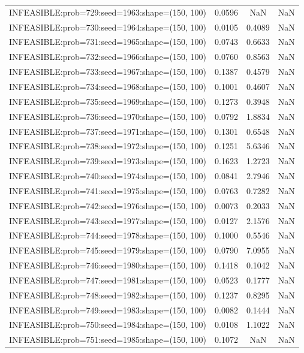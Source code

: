 \begin{longtable}{lccc}
INFEASIBLE:prob=729:seed=1963:shape=(150, 100) & 0.0596 &     NaN &    NaN \\
INFEASIBLE:prob=730:seed=1964:shape=(150, 100) & 0.0105 &  0.4089 &    NaN \\
INFEASIBLE:prob=731:seed=1965:shape=(150, 100) & 0.0743 &  0.6633 &    NaN \\
INFEASIBLE:prob=732:seed=1966:shape=(150, 100) & 0.0760 &  0.8563 &    NaN \\
INFEASIBLE:prob=733:seed=1967:shape=(150, 100) & 0.1387 &  0.4579 &    NaN \\
INFEASIBLE:prob=734:seed=1968:shape=(150, 100) & 0.1001 &  0.4607 &    NaN \\
INFEASIBLE:prob=735:seed=1969:shape=(150, 100) & 0.1273 &  0.3948 &    NaN \\
INFEASIBLE:prob=736:seed=1970:shape=(150, 100) & 0.0792 &  1.8834 &    NaN \\
INFEASIBLE:prob=737:seed=1971:shape=(150, 100) & 0.1301 &  0.6548 &    NaN \\
INFEASIBLE:prob=738:seed=1972:shape=(150, 100) & 0.1251 &  5.6346 &    NaN \\
INFEASIBLE:prob=739:seed=1973:shape=(150, 100) & 0.1623 &  1.2723 &    NaN \\
INFEASIBLE:prob=740:seed=1974:shape=(150, 100) & 0.0841 &  2.7946 &    NaN \\
INFEASIBLE:prob=741:seed=1975:shape=(150, 100) & 0.0763 &  0.7282 &    NaN \\
INFEASIBLE:prob=742:seed=1976:shape=(150, 100) & 0.0073 &  0.2033 &    NaN \\
INFEASIBLE:prob=743:seed=1977:shape=(150, 100) & 0.0127 &  2.1576 &    NaN \\
INFEASIBLE:prob=744:seed=1978:shape=(150, 100) & 0.1000 &  0.5546 &    NaN \\
INFEASIBLE:prob=745:seed=1979:shape=(150, 100) & 0.0790 &  7.0955 &    NaN \\
INFEASIBLE:prob=746:seed=1980:shape=(150, 100) & 0.1418 &  0.1042 &    NaN \\
INFEASIBLE:prob=747:seed=1981:shape=(150, 100) & 0.0523 &  0.1777 &    NaN \\
INFEASIBLE:prob=748:seed=1982:shape=(150, 100) & 0.1237 &  0.8295 &    NaN \\
INFEASIBLE:prob=749:seed=1983:shape=(150, 100) & 0.0082 &  0.1444 &    NaN \\
INFEASIBLE:prob=750:seed=1984:shape=(150, 100) & 0.0108 &  1.1022 &    NaN \\
INFEASIBLE:prob=751:seed=1985:shape=(150, 100) & 0.1072 &     NaN &    NaN \\

\end{longtable}
